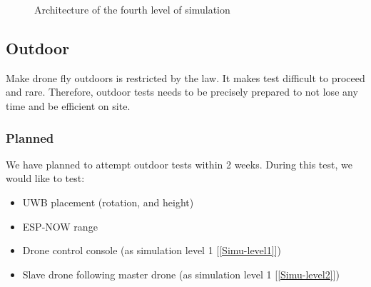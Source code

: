 \begin{figure}[H]
   \centering
   \resizebox{0.8\linewidth}{!}{\LevelQuatre}
   \caption{Architecture of the fourth level of simulation}
\end{figure}

\subsection{Outdoor}
Make drone fly outdoors is restricted by the law. It makes test difficult to proceed and rare. Therefore, outdoor tests needs to be precisely prepared to not lose any time and be efficient on site.
\subsubsection{Planned}
We have planned to attempt outdoor tests within 2 weeks. During this test, we would like to test: 
\begin{itemize}
  \item UWB placement (rotation, and height)
  \item ESP-NOW range 
  \item Drone control console (as simulation level 1 [\ref{Simu-level1}])
  \item Slave drone following master drone (as simulation level 1 [\ref{Simu-level2}])
\end{itemize} 


